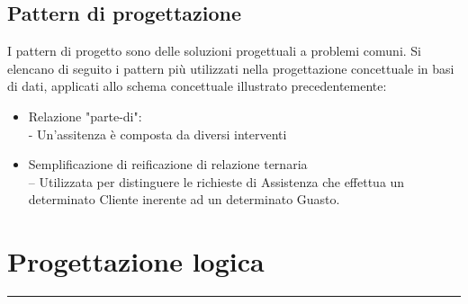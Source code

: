 \documentclass[legalpaper]{article}
\begin{document}
\subsection{Pattern di progettazione}
I pattern di progetto sono delle soluzioni progettuali a problemi comuni. Si elencano di seguito i pattern più utilizzati nella progettazione concettuale in basi di dati, applicati allo schema concettuale illustrato precedentemente:
\begin{itemize}
	\item Relazione "parte-di":\\
	- Un'assitenza è composta da diversi interventi
	
	\item Semplificazione di reificazione di relazione ternaria\\
	– Utilizzata per distinguere le richieste di Assistenza che effettua un determinato Cliente inerente ad un determinato Guasto. 
	

\end{itemize}
	

\newpage
\section{Progettazione logica}
\rule{\linewidth}{1.5pt}
\end{document}
